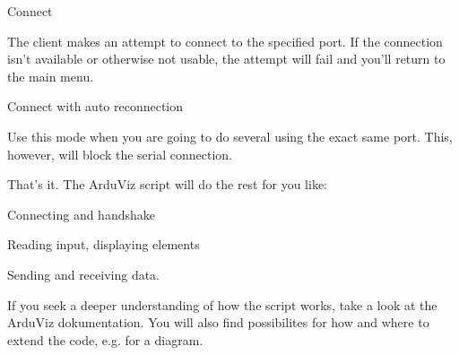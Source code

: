 \begin{DoxyItemize}
\item {\ttfamily Connect}
\begin{DoxyItemize}
\item The client makes an attempt to connect to the specified port. If the connection isn't available or otherwise not usable, the attempt will fail and you'll return to the main menu.
\end{DoxyItemize}
\item {\ttfamily Connect with auto reconnection}
\begin{DoxyItemize}
\item Use this mode when you are going to do several using the exact same port. This, however, will block the serial connection.
\end{DoxyItemize}
\end{DoxyItemize}

That's it. The Ardu\+Viz script will do the rest for you like\+:
\begin{DoxyItemize}
\item Connecting and handshake
\item Reading input, displaying elements
\item Sending and receiving data.
\end{DoxyItemize}

If you seek a deeper understanding of how the script works, take a look at the Ardu\+Viz dokumentation. You will also find possibilites for how and where to extend the code, e.\+g. for a diagram. 